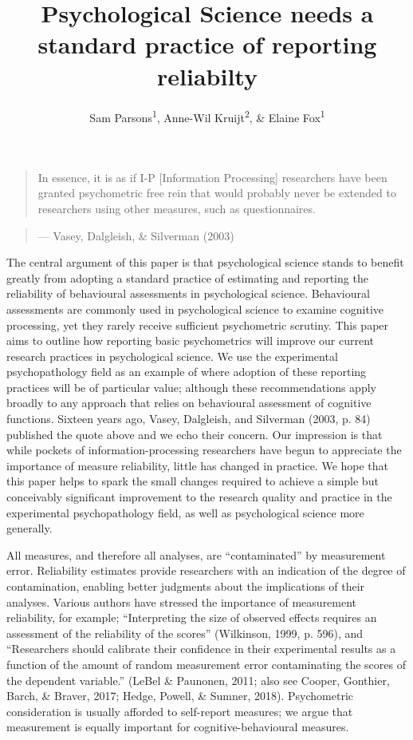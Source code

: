 \documentclass[english,,man,floatsintext]{apa6}
\title{Psychological Science needs a standard practice of reporting reliabilty}
\author{Sam Parsons\textsuperscript{1}, Anne-Wil Kruijt\textsuperscript{2}, \& Elaine Fox\textsuperscript{1}}
\date{}
\affiliation{
\vspace{0.5cm}
\textsuperscript{1} Department of Experimental Psychology, University of Oxford\\\textsuperscript{2} Department of Psychology, Stockholm University}
\begin{document}
\maketitle

\setlength{\abovedisplayskip}{-20pt}
\setlength{\belowdisplayskip}{3pt}
\setlength{\abovedisplayshortskip}{-30pt}
\setlength{\belowdisplayshortskip}{3pt}

\begin{quote}
In essence, it is as if I-P {[}Information Processing{]} researchers have been granted psychometric free rein that would probably never be extended to researchers using other measures, such as questionnaires.
\end{quote}

\begin{quote}
\hfill --- Vasey, Dalgleish, \& Silverman (2003)
\end{quote}

The central argument of this paper is that psychological science stands to benefit greatly from adopting a standard practice of estimating and reporting the reliability of behavioural assessments in psychological science. Behavioural assessments are commonly used in psychological science to examine cognitive processing, yet they rarely receive sufficient psychometric scrutiny. This paper aims to outline how reporting basic psychometrics will improve our current research practices in psychological science. We use the experimental psychopathology field as an example of where adoption of these reporting practices will be of particular value; although these recommendations apply broadly to any approach that relies on behavioural assessment of cognitive functions. Sixteen years ago, Vasey, Dalgleish, and Silverman (2003, p. 84) published the quote above and we echo their concern. Our impression is that while pockets of information-processing researchers have begun to appreciate the importance of measure reliability, little has changed in practice. We hope that this paper helps to spark the small changes required to achieve a simple but conceivably significant improvement to the research quality and practice in the experimental psychopathology field, as well as psychological science more generally.

All measures, and therefore all analyses, are \enquote{contaminated} by measurement error. Reliability estimates provide researchers with an indication of the degree of contamination, enabling better judgments about the implications of their analyses. Various authors have stressed the importance of measurement reliability, for example; \enquote{Interpreting the size of observed effects requires an assessment of the reliability of the scores} (Wilkinson, 1999, p. 596), and \enquote{Researchers should calibrate their confidence in their experimental results as a function of the amount of random measurement error contaminating the scores of the dependent variable.} (LeBel \& Paunonen, 2011; also see Cooper, Gonthier, Barch, \& Braver, 2017; Hedge, Powell, \& Sumner, 2018). Psychometric consideration is usually afforded to self-report measures; we argue that measurement is equally important for cognitive-behavioural measures.
\end{document}
